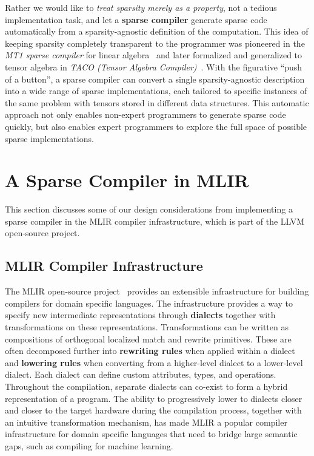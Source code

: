 \documentclass[10pt]{article}
\begin{document}
Rather we would like to \emph{treat sparsity merely as a property}, not a tedious implementation task, and let a \textbf{sparse compiler} generate sparse code automatically from a sparsity-agnostic definition of the computation. This idea of keeping sparsity completely transparent to the programmer was pioneered in the \emph{MT1 sparse compiler} for linear algebra~\cite{drbik,biktms,bikjpdc,biktpds} and later formalized and generalized to tensor algebra in \emph{TACO (Tensor Algebra Compiler)}~\cite{taco,drkjolstad,taco2018,taco2017}. With the figurative ``push of a button'', a sparse compiler can convert a single sparsity-agnostic description into a wide range of sparse implementations, each tailored to specific instances of the same problem with tensors stored in different data structures. This automatic approach not only enables non-expert programmers to generate sparse code quickly, but also enables expert programmers to explore the full space of possible sparse implementations.

\section{A Sparse Compiler in MLIR}
\label{sparsemlir}

This section discusses some of our design considerations from implementing a sparse compiler in the MLIR compiler infrastructure, which is part of the LLVM open-source project.

\subsection{MLIR Compiler Infrastructure}

The MLIR open-source project~\cite{mlir2021,mlir2020} provides an extensible infrastructure for building compilers for domain specific languages. The infrastructure provides a way to specify new intermediate representations through \textbf{dialects} together with transformations on these representations. Transformations can be written as compositions of orthogonal localized match and rewrite primitives. These are often decomposed further into \textbf{rewriting rules} when applied within a dialect and \textbf{lowering rules} when converting from a higher-level dialect to a lower-level dialect. Each dialect can define custom attributes, types, and operations. Throughout the compilation, separate dialects can co-exist to form a hybrid representation of a program. The ability to progressively lower to dialects closer and closer to the target hardware during the compilation process, together with an intuitive transformation mechanism, has made MLIR a popular compiler infrastructure for domain specific languages that need to bridge large semantic gaps, such as compiling for machine learning. 
\end{document}
